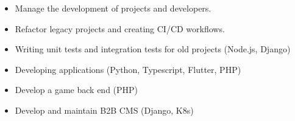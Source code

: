 \documentclass[10pt,a4paper,ragged2e]{altacv}
\begin{document}
\begin{itemize}
    \item Manage the development of projects and developers.
    \item Refactor legacy projects and creating CI/CD workflows.
\end{itemize}
\divider

\begin{itemize}
    \item Writing unit tests and integration tests for old projects (Node.js, Django)
    \item Developing applications (Python, Typescript, Flutter, PHP)
\end{itemize}
\divider

\begin{itemize}
    \item Develop a game back end (PHP)
    \item Develop and maintain B2B CMS (Django, K8s)
\end{itemize}
\divider


\clearpage
\end{document}
